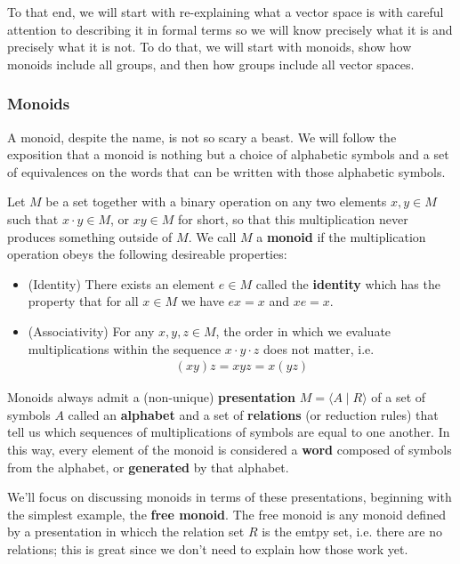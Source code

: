 \documentclass[11pt]{article}
\begin{document}
To that end, we will start with re-explaining what a vector space is with careful attention to describing it in formal terms so we will know precisely what it is and precisely what it is not. To do that, we will start with monoids, show how monoids include all groups, and then how groups include all vector spaces.

\subsubsection{Monoids}

A monoid, despite the name, is not so scary a beast. We will follow the exposition that a monoid is nothing but a choice of alphabetic symbols and a set of equivalences on the words that can be written with those alphabetic symbols.

\begin{definition}[Monoid]
Let $M$ be a set together with a binary  operation on any two elements $x,y \in M$ such that $x \cdot y \in M$, or $xy \in M$ for short, so that this multiplication never produces something outside of $M$. We call $M$ a \textbf{monoid} if the multiplication operation obeys the following desireable properties: \begin{itemize}
\item (Identity) There exists an element $e\in M$ called the \textbf{identity} which has the property that for all $x \in M$ we have $ex = x$ and $xe = x$.
\item (Associativity) For any $x,y,z \in M$, the order in which we evaluate multiplications within the sequence $x\cdot y \cdot z$ does not matter, i.e. \begin{gather*}
(xy)z = xyz = x(yz)
\end{gather*}
\end{itemize}
Monoids always admit a (non-unique) \textbf{presentation} $M = \langle A \mid R \rangle$ of a set of symbols $A$ called an \textbf{alphabet} and a set of \textbf{relations} (or reduction rules) that tell us which sequences of multiplications of symbols are equal to one another. In this way, every element of the monoid is considered a \textbf{word} composed of symbols from the alphabet, or \textbf{generated} by that alphabet.
\end{definition}

We'll focus on discussing monoids in terms of these presentations, beginning with the simplest example, the \textbf{free monoid}. The free monoid is any monoid defined by a presentation in whicch the relation set $R$ is the emtpy set, i.e. there are no relations; this is great since we don't need to explain how those work yet.
\end{document}

